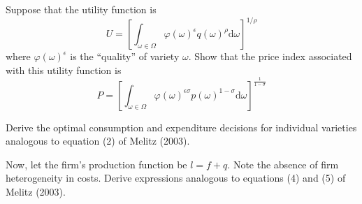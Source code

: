 \documentclass[10pt]{article}
\begin{document}
Suppose that the utility function is
$$
U = \left[\int_{\omega\in\Omega} \varphi(\omega)^{\epsilon} q(\omega)^{\rho}\textrm{d}\omega\right]^{1/\rho}
$$
where $\varphi(\omega)^{\epsilon}$ is the ``quality'' of variety $\omega$.
Show that the price index associated with this utility function is
$$
P = \left[ \int_{\omega\in\Omega} \varphi(\omega)^{\epsilon\sigma} p(\omega)^{1-\sigma} \textrm{d} \omega \right]^{\frac{1}{1-\sigma}}
$$

Derive the optimal consumption and expenditure decisions for individual varieties analogous to equation (2) of Melitz (2003).

Now, let the firm's production function be $l = f+q$.
Note the absence of firm heterogeneity in costs.
Derive expressions analogous to equations (4) and (5) of Melitz (2003).
\end{document}
